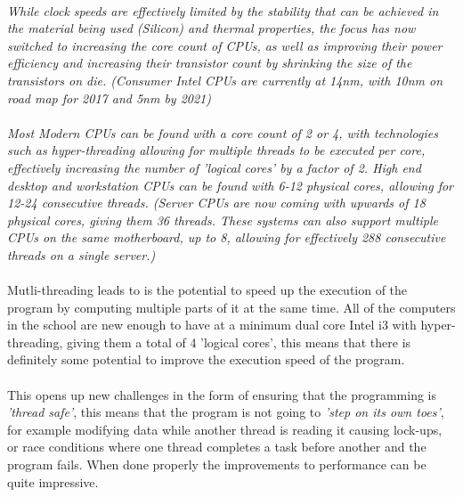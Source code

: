 \paragraph{}
\textit{While clock speeds are effectively limited by the stability that can be achieved in the material being used (Silicon) and thermal properties, the focus has now switched to increasing the core count of CPUs, as well as improving their power efficiency and increasing their transistor count by shrinking the size of the transistors on die. (Consumer Intel CPUs are currently at 14nm, with 10nm on road map for 2017 and 5nm by 2021)}

\paragraph{}
\textit{Most Modern CPUs can be found with a core count of 2 or 4, with technologies such as hyper-threading allowing for multiple threads to be executed per core, effectively increasing the number of 'logical cores' by a factor of 2. High end desktop and workstation CPUs can be found with 6-12 physical cores, allowing for 12-24 consecutive threads. (Server CPUs are now coming with upwards of 18 physical cores, giving them 36 threads. These systems can also support multiple CPUs on the same motherboard, up to 8, allowing for effectively 288 consecutive threads on a single server.)}

\paragraph{}
Mutli-threading leads to is the potential to speed up the execution of the program by computing multiple parts of it at the same time. All of the computers in the school are new enough to have at a minimum dual core Intel i3 with hyper-threading, giving them a total of 4 'logical cores', this means that there is definitely some potential to improve the execution speed of the program.

\paragraph{} 
This opens up new challenges in the form of ensuring that the programming is \textit{'thread safe'}, this means that the program is not going to \textit{'step on its own toes'}, for example modifying data while another thread is reading it causing lock-ups, or race conditions where one thread completes a task before another and the program fails. When done properly the improvements to performance can be quite impressive.

